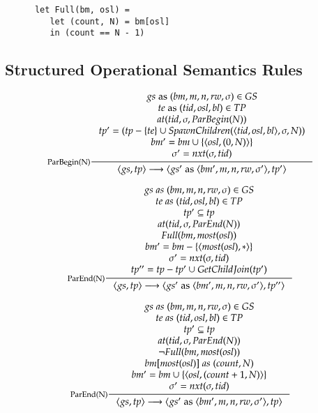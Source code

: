 \begin{compactitem}
  \begin{center}
    \lstset{language=[Objective]Caml}
    \begin{lstlisting}
      let Full(bm, osl) =
         let (count, N) = bm[osl]
         in (count == N - 1)
    \end{lstlisting}
  \end{center}
\end{compactitem}

\subsection{Structured Operational Semantics Rules}
\label{sec:sosrules}

\begin{framed}
  \[
  \inference[ParBegin(N)]{
    gs\; {\rm as}\; (bm, m, n, rw, \sigma) \in GS \\
    te\; {\rm as}\; (tid, osl, bl) \in TP \\
    at(tid, \sigma, ParBegin(N)) \\
    tp' = (tp - \{te\} \cup SpawnChildren(\langle tid, osl, bl \rangle, \sigma, N))\\
    bm' = bm \cup \{\langle osl,(0,N)\rangle\}\\
    \sigma' = nxt(\sigma, tid)
  }
  {\langle gs, tp \rangle \longrightarrow
    \langle gs'\; {\rm as}\; \langle bm',m,n,rw,\sigma'\rangle, tp' \rangle
  }
  \]
  
  \[
  \inference[ParEnd(N)]{
    gs\; as\; (bm, m, n, rw, \sigma) \in GS \\
    te\; as\; (tid, osl, bl) \in TP \\
    tp' \subseteq tp \\
    at(tid, \sigma, ParEnd(N)) \\
    Full(bm, most(osl)) \\
    bm' = bm - \{\langle most(osl), * \rangle\} \\
    \sigma' = nxt(\sigma, tid) \\
    tp'' = tp - tp' \cup GetChildJoin(tp')}
  {\langle gs, tp \rangle \longrightarrow
    \langle gs'\; {\rm as}\; \langle bm',m,n,rw,\sigma'\rangle, tp'' \rangle
  }
  \]

  \[
  \inference[ParEnd(N)]{
    gs\; as\; (bm, m, n, rw, \sigma) \in GS \\
    te\; as\; (tid, osl, bl) \in TP \\
    tp' \subseteq tp \\
    at(tid, \sigma, ParEnd(N)) \\
    \neg Full(bm, most(osl)) \\
    bm[most(osl)]\; as\; (count, N) \\
    bm' = bm \cup \{\langle osl,(count+1,N) \rangle\} \\
    \sigma' = nxt(\sigma, tid)}
  {\langle gs, tp \rangle \longrightarrow \langle gs'\; {\rm as}\; \langle bm',m,n,rw,\sigma'\rangle, tp \rangle}
  \]


\end{framed}
